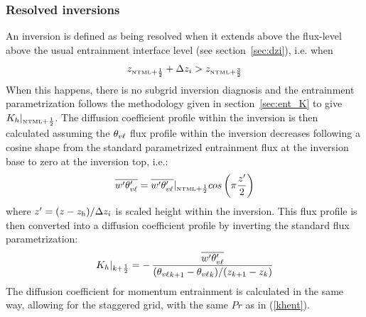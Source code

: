 \documentclass{UMDP_article}
\begin{document}
\subsubsection{Resolved inversions}
\label{sec:entr_prof}
An inversion is defined as being resolved when it extends above the
flux-level above the usual entrainment interface level (see
section~\ref{sec:dzi}), \mbox{i.e.} when
\begin{equation*}
  z_{\mbox{\tiny \rm NTML}+\frac{1}{2}} + \Delta z_i > z_{\mbox{\tiny \rm NTML}+\frac{3}{2}}
\end{equation*}
When this happens, there is no subgrid inversion diagnosis and the
entrainment parametrization follows the methodology given in
section~\ref{sec:ent_K} to give $K_h|_{\mbox{\tiny \rm NTML}+\frac{1}{2}}$.  The
diffusion coefficient profile within the inversion is then calculated
assuming the $\theta_{v\ell}$ flux profile within the inversion decreases
following a cosine shape from the standard parametrized entrainment
flux at the inversion base to zero at the inversion top, \mbox{i.e.}:
\begin{equation}
  \overline{w'\theta_{v\ell}'} = \overline{w'\theta_{v\ell}'}|_{\mbox{\tiny \rm NTML}+\frac{1}{2}}  
                           cos\left(\pi \frac{z'}{2} \right) 
  \label{ent_svl}
\end{equation}
where $z'=(z-z_{\rm h})/\Delta z_i$ is scaled height within the inversion.
This flux profile is then converted into a diffusion coefficient
profile by inverting the standard flux parametrization:
\begin{equation*}
  K_h|_{k+\frac{1}{2}}= - \, \frac{\overline{w'\theta_{v\ell}'} }
                   { ({\theta_{v\ell}}_{k+1}-{\theta_{v\ell}}_{k})/(z_{k+1}-z_k) }
\end{equation*}
The diffusion coefficient for momentum entrainment is calculated in
the same way, allowing for the staggered grid, with the same $Pr$ as
in (\ref{khent}).
\end{document}
